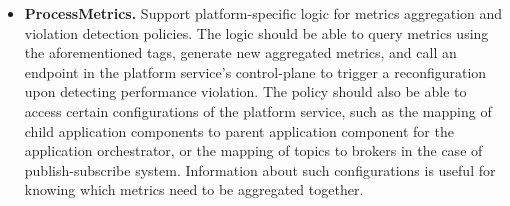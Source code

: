 \begin{itemize}
\item \textbf{ProcessMetrics. }Support platform-specific logic for metrics aggregation and violation detection policies. The logic should be able to query metrics using the aforementioned tags, generate new aggregated metrics, and call an endpoint in the platform service's control-plane to trigger a reconfiguration upon detecting performance violation. The policy should also be able to access certain configurations of the platform service, such as the mapping of child application components to parent application component for the application orchestrator, or the mapping of topics to brokers in the case of publish-subscribe system. Information about such configurations is useful for knowing which metrics need to be aggregated together.
\end{itemize}


